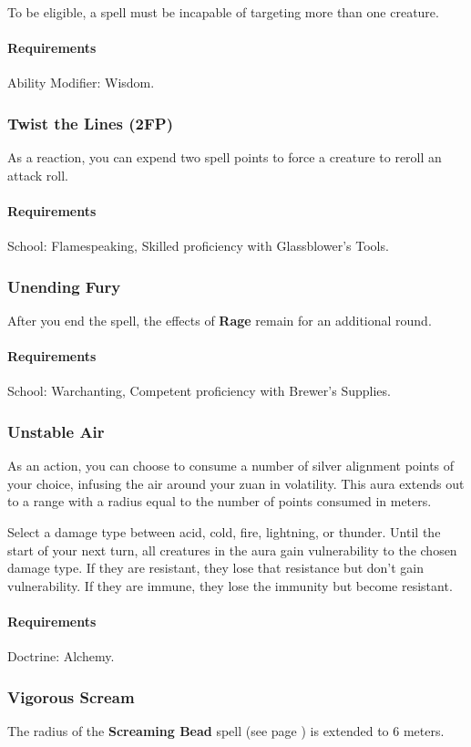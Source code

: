     To be eligible, a spell must be incapable of targeting more than one creature.
    \paragraph{Requirements} Ability Modifier: Wisdom.
\subsubsection{Twist the Lines (2FP)} \label{feat::twistthelines}
    As a reaction, you can expend two spell points to force a creature to reroll an attack roll.
    \paragraph{Requirements} School: Flamespeaking, Skilled proficiency with Glassblower's Tools.
\subsubsection{Unending Fury} \label{feat::unendingfury}
    After you end the spell, the effects of \textbf{Rage} remain for an additional round.
    \paragraph{Requirements} School: Warchanting, Competent proficiency with Brewer's Supplies.
\subsubsection{Unstable Air} \label{feat::unstableair}
    As an action, you can choose to consume a number of silver alignment points of your choice, infusing the air around your zuan in volatility.
    This aura extends out to a range with a radius equal to the number of points consumed in meters.

    Select a damage type between acid, cold, fire, lightning, or thunder.
    Until the start of your next turn, all creatures in the aura gain vulnerability to the chosen damage type.
    If they are resistant, they lose that resistance but don't gain vulnerability.
    If they are immune, they lose the immunity but become resistant.
    \paragraph{Requirements} Doctrine: Alchemy.
\subsubsection{Vigorous Scream} \label{feat::vigorousscream}
    The radius of the \textbf{Screaming Bead} spell (see page \pageref{spell::screamingbead}) is extended to 6 meters.

